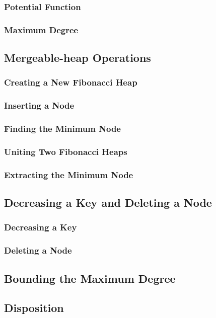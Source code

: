 \documentclass[12pt]{article}
\begin{document}
\subsubsection{Potential Function}
\subsubsection{Maximum Degree}

\subsection{Mergeable-heap Operations}
\subsubsection{Creating a New Fibonacci Heap}
\subsubsection{Inserting a Node}
\subsubsection{Finding the Minimum Node}
\subsubsection{Uniting Two Fibonacci Heaps}
\subsubsection{Extracting the Minimum Node}

\subsection{Decreasing a Key and Deleting a Node}
\subsubsection{Decreasing a Key}
\subsubsection{Deleting a Node}

\subsection{Bounding the Maximum Degree}

\subsection{Disposition}
\newpage
\end{document}

